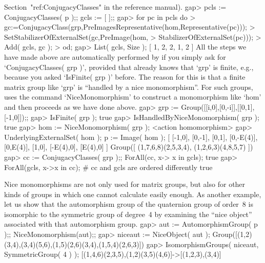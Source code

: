Section~"ref:ConjugacyClasses" in the reference manual).
\beginexample
gap> pcls := ConjugacyClasses( p );; gcls := [  ];;
gap> for pc  in pcls  do
>      gc:=ConjugacyClass(grp,PreImagesRepresentative(hom,Representative(pc)));
>      SetStabilizerOfExternalSet(gc,PreImage(hom,
>                                 StabilizerOfExternalSet(pc)));
>      Add( gcls, gc );
>    od;
gap> List( gcls, Size );
[ 1, 2, 2, 1, 2 ]
\endexample
All the steps we have made above are automatically performed by {\GAP} if
you  simply ask for `ConjugacyClasses(   grp   )', provided that   {\GAP}
already knows  that `grp' is finite, e.g.,  because  you asked `IsFinite(
grp  )' before. The reason  for this is that  a  finite matrix group like
`grp' is ``handled by a nice monomorphism''. For such groups, {\GAP} uses
the command `NiceMonomorphism' to construct a monomorphism like `hom' and
then proceeds as we have done above.
\beginexample
gap> grp := Group([[i,0],[0,-i]],[[0,1],[-1,0]]);;
gap> IsFinite( grp );
true
gap> IsHandledByNiceMonomorphism( grp );
true
gap> hom := NiceMonomorphism( grp );
<action homomorphism>
gap> UnderlyingExternalSet( hom ); p := Image( hom );
[ [-1,0], [0,-1], [0,1], [0,-E(4)], [0,E(4)], [1,0], [-E(4),0], [E(4),0] ]
Group([ (1,7,6,8)(2,5,3,4), (1,2,6,3)(4,8,5,7) ])
gap> cc := ConjugacyClasses( grp );; ForAll(cc, x-> x in gcls); 
true
gap> ForAll(gcls, x->x in cc); # cc and gcls are ordered differently
true
\endexample

%

Nice monomorphisms are not only used for matrix groups, but also for
other kinds of groups in which one cannot calculate easily enough. As
another example, let us show that the automorphism group of the
quaternion group of order~8 is isomorphic to the symmetric group of
degree~4  by examining the ``nice object'' associated with that
automorphism group.
\beginexample
gap> aut := AutomorphismGroup( p );; NiceMonomorphism(aut);;
gap> niceaut := NiceObject( aut );
Group([(1,2)(3,4),(3,4)(5,6),(1,5)(2,6)(3,4),(1,5,4)(2,6,3)])
gap> IsomorphismGroups( niceaut, SymmetricGroup( 4 ) );
[(1,4,6)(2,3,5),(1,2)(3,5)(4,6)]->[(1,2,3),(3,4)]
\endexample

